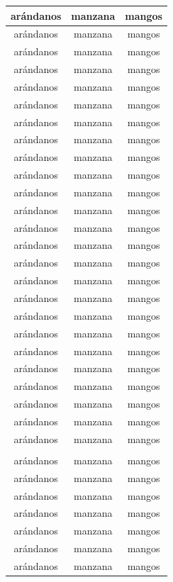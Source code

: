\documentclass{report}
\begin{document}
\begin{longtable}{|c|c|c|}
	arándanos & manzana & mangos \\
	\hline
		\hline
	arándanos & manzana & mangos \\
	\hline
	arándanos & manzana & mangos \\
	arándanos & manzana & mangos \\
	\hline
		\hline
	arándanos & manzana & mangos \\
	\hline
	arándanos & manzana & mangos \\
	arándanos & manzana & mangos \\
	\hline
		\hline
	arándanos & manzana & mangos \\
	\hline
	arándanos & manzana & mangos \\
	arándanos & manzana & mangos \\
	\hline
		\hline
	arándanos & manzana & mangos \\
	\hline
	arándanos & manzana & mangos \\
	arándanos & manzana & mangos \\
	\hline
		\hline
	arándanos & manzana & mangos \\
	\hline
	arándanos & manzana & mangos \\
	arándanos & manzana & mangos \\
	\hline
		\hline
	arándanos & manzana & mangos \\
	\hline
	arándanos & manzana & mangos \\
	arándanos & manzana & mangos \\
	\hline
		\hline
	arándanos & manzana & mangos \\
	\hline
	arándanos & manzana & mangos \\
	arándanos & manzana & mangos \\
	\hline
		\hline
	arándanos & manzana & mangos \\
	\hline
	arándanos & manzana & mangos \\
	arándanos & manzana & mangos \\
	\hline
	\\
	\hline
	arándanos & manzana & mangos \\
	\hline
	arándanos & manzana & mangos \\
	arándanos & manzana & mangos \\
	\hline
		arándanos & manzana & mangos \\
	\hline
	arándanos & manzana & mangos \\
	arándanos & manzana & mangos \\
	\hline
	\hline
	arándanos & manzana & mangos \\

\end{longtable}
\end{document}
